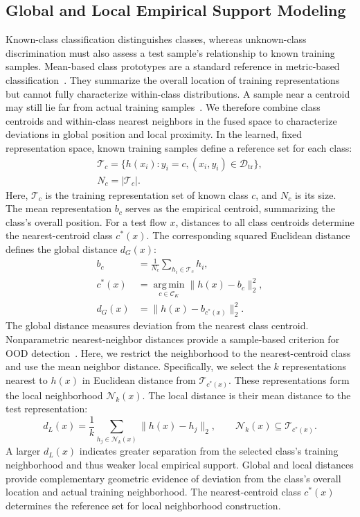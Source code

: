\subsection{Global and Local Empirical Support Modeling}
Known-class classification distinguishes classes, whereas unknown-class discrimination must also assess a test sample's relationship to known training samples. Mean-based class prototypes are a standard reference in metric-based classification~. They summarize the overall location of training representations but cannot fully characterize within-class distributions. A sample near a centroid may still lie far from actual training samples~. We therefore combine class centroids and within-class nearest neighbors in the fused space to characterize deviations in global position and local proximity. In the learned, fixed representation space, known training samples define a reference set for each class:
\begin{equation*}
\begin{gathered}
\mathcal{T}_c=\{h(x_i):y_i=c,(x_i,y_i)\in\mathcal{D}_{\mathrm{tr}}\},
\\
N_c=|\mathcal{T}_c|.
\end{gathered}
\end{equation*}
Here, $\mathcal T_c$ is the training representation set of known class $c$, and $N_c$ is its size. The mean representation $b_c$ serves as the empirical centroid, summarizing the class's overall position. For a test flow $x$, distances to all class centroids determine the nearest-centroid class $c^*(x)$. The corresponding squared Euclidean distance defines the global distance $d_G(x)$:
\begin{equation}
\begin{aligned}
b_c&=\frac{1}{N_c}\sum_{h_i\in\mathcal{T}_c}h_i,\\
c^*(x)&=\operatorname*{arg\,min}_{c\in\mathcal{C}_K}
\|h(x)-b_c\|_2^2,\\
d_G(x)&=\|h(x)-b_{c^*(x)}\|_2^2.
\end{aligned}
\tag{11}
\end{equation}
The global distance measures deviation from the nearest class centroid. Nonparametric nearest-neighbor distances provide a sample-based criterion for OOD detection~. Here, we restrict the neighborhood to the nearest-centroid class and use the mean neighbor distance. Specifically, we select the $k$ representations nearest to $h(x)$ in Euclidean distance from $\mathcal{T}_{c^*(x)}$. These representations form the local neighborhood $\mathcal{N}_k(x)$. The local distance is their mean distance to the test representation:
\begin{equation}
d_L(x)=
\frac{1}{k}
\sum_{h_j\in\mathcal{N}_k(x)}
\|h(x)-h_j\|_2,
\qquad
\mathcal{N}_k(x)\subseteq\mathcal{T}_{c^*(x)}.
\tag{12}
\end{equation}
A larger $d_L(x)$ indicates greater separation from the selected class's training neighborhood and thus weaker local empirical support. Global and local distances provide complementary geometric evidence of deviation from the class's overall location and actual training neighborhood. The nearest-centroid class $c^*(x)$ determines the reference set for local neighborhood construction.

